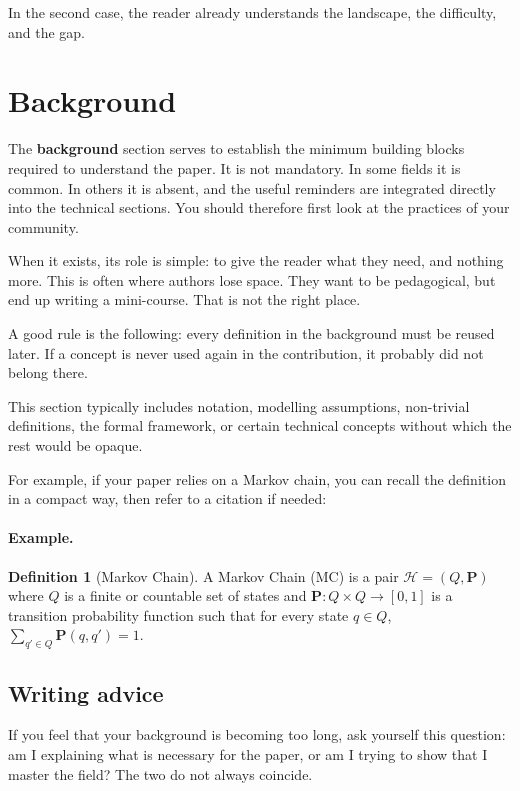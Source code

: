 \documentclass[11pt,a4paper]{article}
\theoremstyle{definition}
\newtheorem{definition}{Definition}
\begin{document}
In the second case, the reader already understands the landscape, the difficulty, and the gap.

\section{Background}

The \textbf{background} section serves to establish the minimum building blocks required to understand the paper. It is not mandatory. In some fields it is common. In others it is absent, and the useful reminders are integrated directly into the technical sections. You should therefore first look at the practices of your community.

When it exists, its role is simple: to give the reader what they need, and nothing more. This is often where authors lose space. They want to be pedagogical, but end up writing a mini-course. That is not the right place.

A good rule is the following: every definition in the background must be reused later. If a concept is never used again in the contribution, it probably did not belong there.

This section typically includes notation, modelling assumptions, non-trivial definitions, the formal framework, or certain technical concepts without which the rest would be opaque.

For example, if your paper relies on a Markov chain, you can recall the definition in a compact way, then refer to a citation if needed:

\paragraph{Example.}
\begin{definition}[Markov Chain]
A Markov Chain (MC) is a pair $\mathcal{H}=(Q,\mathbf{P})$ where $Q$ is a finite or countable set of states and $\mathbf{P}: Q \times Q \rightarrow [0,1]$ is a transition probability function such that for every state $q \in Q$, $\sum_{q' \in Q}\mathbf{P}(q,q')=1$.
\end{definition}

\subsection*{Writing advice}

If you feel that your background is becoming too long, ask yourself this question: am I explaining what is necessary for the paper, or am I trying to show that I master the field? The two do not always coincide.
\end{document}
